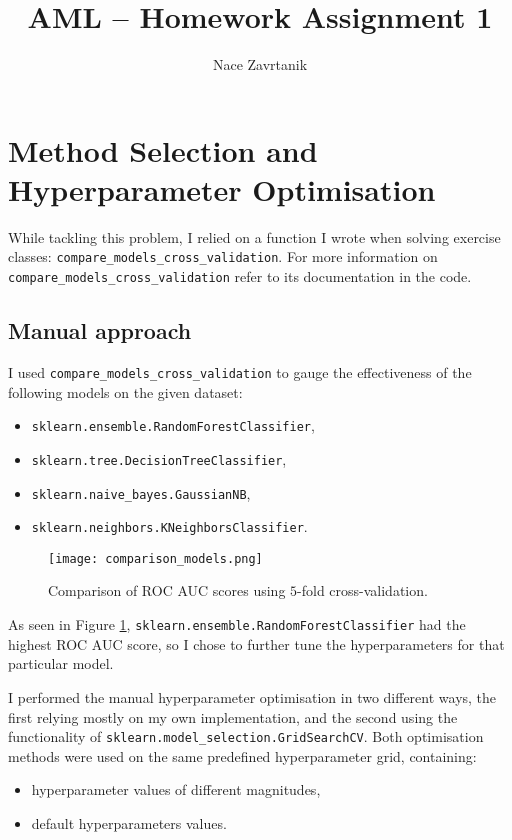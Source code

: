 \documentclass[10pt, a4paper]{article}
\title{AML -- Homework Assignment 1}
\author{Nace Zavrtanik}
\begin{document}
\maketitle


\section{Method Selection and Hyperparameter Optimisation}

\noindent While tackling this problem, I relied on a function I wrote when solving exercise classes:
\verb|compare_models_cross_validation|. For more information on \verb|compare_models_cross_validation| refer
to its documentation in the code.

\subsection{Manual approach}
I used \verb|compare_models_cross_validation| to gauge the effectiveness of the following models on the given dataset:
\begin{itemize}
\item \verb|sklearn.ensemble.RandomForestClassifier|,
\item \verb|sklearn.tree.DecisionTreeClassifier|,
\item \verb|sklearn.naive_bayes.GaussianNB|,
\item \verb|sklearn.neighbors.KNeighborsClassifier|.
\end{itemize}
\begin{figure}
\centering
\texttt{[image: comparison\_models.png]}
\caption{Comparison of ROC AUC scores using $5$-fold cross-validation.}
\label{fig1}
\end{figure}
As seen in Figure \ref{fig1}, \verb|sklearn.ensemble.RandomForestClassifier| had the highest ROC AUC score, so I chose to
further tune the hyperparameters for that particular model.

I performed the manual hyperparameter optimisation in two different ways, the first relying mostly on my own
implementation, and the second using the functionality of \verb|sklearn.model_selection.GridSearchCV|. Both
optimisation methods were used on the same predefined hyperparameter grid, containing:
\begin{itemize}
\item hyperparameter values of different magnitudes,
\item default hyperparameters values.
\end{itemize}
\end{document}

